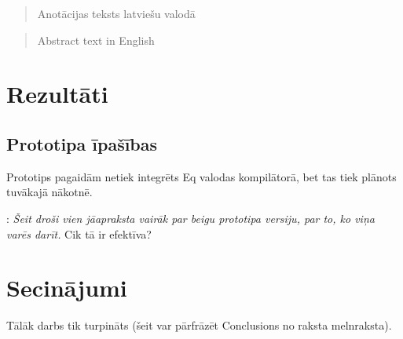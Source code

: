 \documentclass[12pt, a4paper]{report}
\newcommand{\fixme}[1]{\vskip 5mm\noindent{\bf FIXME}: {\it #1}}
\begin{document}
\titullapa

\begin{abstract}
Anotācijas teksts latviešu valodā
\end{abstract}

\begin{otherlanguage}{english}
\begin{abstract}
Abstract text in English
\end{abstract}
\end{otherlanguage}

\setcounter{tocdepth}{4}
\tableofcontents













\section{Rezultāti}
\subsection{Prototipa īpašības}
 Prototips pagaidām netiek integrēts Eq valodas kompilātorā, bet tas tiek plānots tuvākajā nākotnē.

\fixme{Šeit droši vien jāapraksta vairāk par beigu prototipa versiju, par to, ko viņa varēs darīt.} Cik tā ir efektīva?

\section{Secinājumi}
Tālāk darbs tik turpināts (šeit var pārfrāzēt Conclusions no raksta melnraksta).



{}

\end{document}
